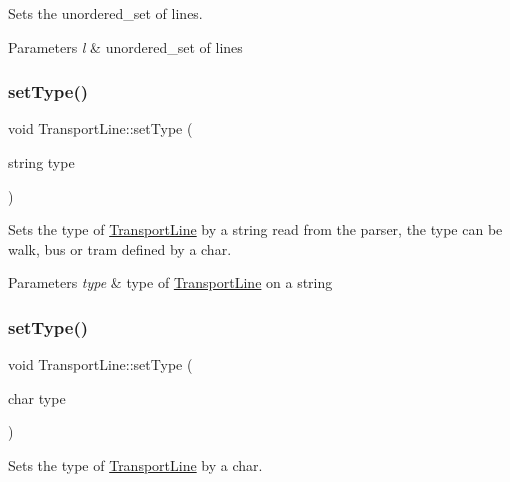 Sets the unordered\+\_\+set of lines. 


\begin{DoxyParams}{Parameters}
{\em l} & unordered\+\_\+set of lines \\
\hline
\end{DoxyParams}
\mbox{\label{class_transport_line_a134eac7334a92d4efe98092277895580}} 
\subsubsection{\texorpdfstring{set\+Type()}{setType()}\hspace{0.1cm}{\footnotesize\ttfamily [1/2]}}
{\footnotesize\ttfamily void Transport\+Line\+::set\+Type (\begin{DoxyParamCaption}\item[{string}]{type }\end{DoxyParamCaption})}



Sets the type of \hyperlink{class_transport_line}{Transport\+Line} by a string read from the parser, the type can be walk, bus or tram defined by a char. 


\begin{DoxyParams}{Parameters}
{\em type} & type of \hyperlink{class_transport_line}{Transport\+Line} on a string \\
\hline
\end{DoxyParams}
\mbox{\label{class_transport_line_a18f279b7f0ed3b0bccbdffce4e38ad81}} 
\subsubsection{\texorpdfstring{set\+Type()}{setType()}\hspace{0.1cm}{\footnotesize\ttfamily [2/2]}}
{\footnotesize\ttfamily void Transport\+Line\+::set\+Type (\begin{DoxyParamCaption}\item[{char}]{type }\end{DoxyParamCaption})}



Sets the type of \hyperlink{class_transport_line}{Transport\+Line} by a char. 


